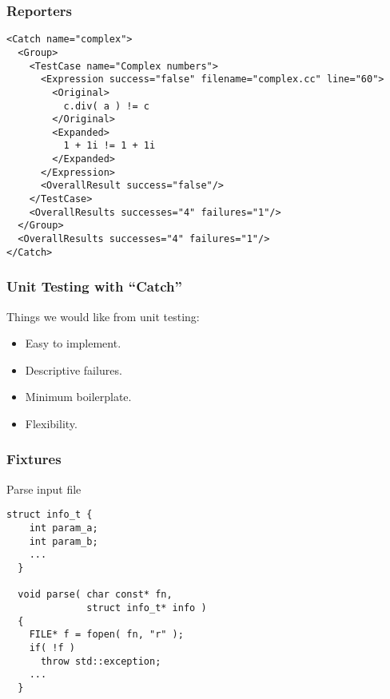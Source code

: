 \begin{frame}[fragile]
  \frametitle{Reporters}
  \footnotesize
  \begin{verbatim}
<Catch name="complex">
  <Group>
    <TestCase name="Complex numbers">
      <Expression success="false" filename="complex.cc" line="60">
        <Original>
          c.div( a ) != c
        </Original>
        <Expanded>
          1 + 1i != 1 + 1i
        </Expanded>
      </Expression>
      <OverallResult success="false"/>
    </TestCase>
    <OverallResults successes="4" failures="1"/>
  </Group>
  <OverallResults successes="4" failures="1"/>
</Catch>
  \end{verbatim}
\end{frame}

\begin{frame}[fragile]
  \frametitle{Unit Testing with ``Catch''}
  Things we would like from unit testing:
  \begin{itemize}
  \vspace{0.5cm}
  \item Easy to implement.
  \vspace{0.5cm}
  \item Descriptive failures.
  \vspace{0.5cm}
  \item Minimum boilerplate.
  \vspace{0.5cm}
  \item Flexibility.
  \end{itemize}
\end{frame}

\begin{frame}[fragile]
  \frametitle{Fixtures}
  \begin{block}{Parse input file}
    \begin{lstlisting}[style=C]
  struct info_t {
    int param_a;
    int param_b;
    ...
  }

  void parse( char const* fn,
              struct info_t* info )
  {
    FILE* f = fopen( fn, "r" );
    if( !f )
      throw std::exception;
    ...
  }
    \end{lstlisting}
  \end{block}
\end{frame}

